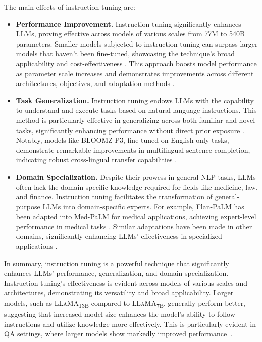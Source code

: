 The main effects of instruction tuning are:
\begin{itemize}
	\item \textbf{Performance Improvement.} {
		      Instruction tuning significantly enhances LLMs, proving effective across models of various scales from 77M to 540B parameters. Smaller models subjected to instruction tuning can surpass larger models that haven't been fine-tuned, showcasing the technique's broad applicability and cost-effectiveness \cite{tamkin2021understanding, wei2022fine}. This approach boosts model performance as parameter scale increases and demonstrates improvements across different architectures, objectives, and adaptation methods \cite{raffel2023exploring}.
	      }
	\item \textbf{Task Generalization.} {
		      Instruction tuning endows LLMs with the capability to understand and execute tasks based on natural language instructions. This method is particularly effective in generalizing across both familiar and novel tasks, significantly enhancing performance without direct prior exposure \cite{chowdhery2022palm, tamkin2021understanding}. Notably, models like BLOOMZ-P3, fine-tuned on English-only tasks, demonstrate remarkable improvements in multilingual sentence completion, indicating robust cross-lingual transfer capabilities \cite{chowdhery2022palm}.
	      }
	\item \textbf{Domain Specialization.} {
		      Despite their prowess in general NLP tasks, LLMs often lack the domain-specific knowledge required for fields like medicine, law, and finance. Instruction tuning facilitates the transformation of general-purpose LLMs into domain-specific experts. For example, Flan-PaLM has been adapted into Med-PaLM for medical applications, achieving expert-level performance in medical tasks \cite{raffel2023exploring}. Similar adaptations have been made in other domains, significantly enhancing LLMs' effectiveness in specialized applications \cite{wei2022fine}.
	      }
\end{itemize}

In summary, instruction tuning is a powerful technique that significantly enhances LLMs' performance, generalization, and domain specialization.
Instruction tuning's effectiveness is evident across models of various scales and architectures, demonstrating its versatility and broad applicability.
Larger models, such as \textsc{LLaMA}\textsubscript{13B} compared to \textsc{LLaMA}\textsubscript{7B}, generally perform better, suggesting that increased model size enhances the model's ability to follow instructions and utilize knowledge more effectively.
This is particularly evident in QA settings, where larger models show markedly improved performance~\cite{survey}.

